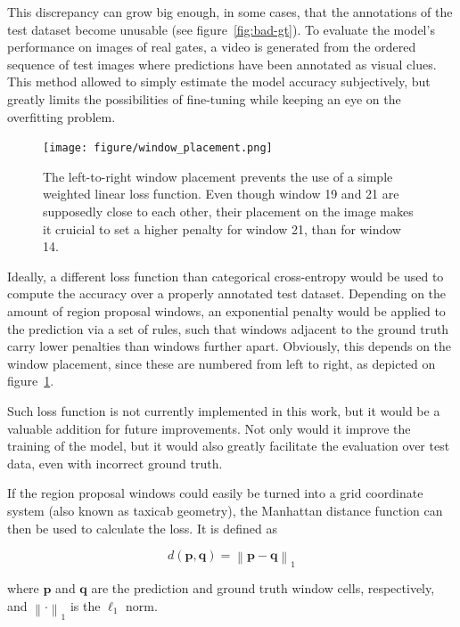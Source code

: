 This discrepancy can grow big enough, in some cases, that the annotations of
the test dataset become unusable (see figure~\ref{fig:bad-gt}). To evaluate the
model's performance on images of real gates, a video is generated from the
ordered sequence of test images where predictions have been annotated as visual
clues. This method allowed to simply estimate the model accuracy subjectively,
but greatly limits the possibilities of fine-tuning while keeping an eye on the
overfitting problem.\\

\begin{figure}[h]
	\centering
	\texttt{[image: figure/window\_placement.png]}
	\caption[Window placement and the need for a custom loss function]
		{The left-to-right window placement prevents the use of a simple
		weighted linear loss function. Even though window 19 and 21 are
		supposedly close to each other, their placement on the image makes it
		cruicial to set a higher penalty for window 21, than for window 14.}
	\label{fig:window-placement}
\end{figure}

Ideally, a different loss function than categorical cross-entropy would be used
to compute the accuracy over a properly annotated test dataset. Depending on
the amount of region proposal windows, an exponential penalty would be applied
to the prediction via a set of rules, such that windows adjacent to the ground
truth carry lower penalties than windows further apart. Obviously, this depends
on the window placement, since these are numbered from left to right, as
depicted on figure~\ref{fig:window-placement}.

Such loss function is not currently implemented in this work, but it would be a
valuable addition for future improvements. Not only would it improve the
training of the model, but it would also greatly facilitate the evaluation over
test data, even with incorrect ground truth.

If the region proposal windows could easily be turned into a grid coordinate
system (also known as taxicab geometry), the Manhattan distance function can
then be used to calculate the loss. It is defined as

\begin{equation}
	d(\mathbf{p}, \mathbf{q}) = \left \|\mathbf{p}-\mathbf{q} \right \|_1
\end{equation}

where $\mathbf{p}$ and $\mathbf{q}$ are the prediction and ground truth window
cells, respectively, and $\left \| \cdot \right \|_1$ is the $\ell_1$ norm.
